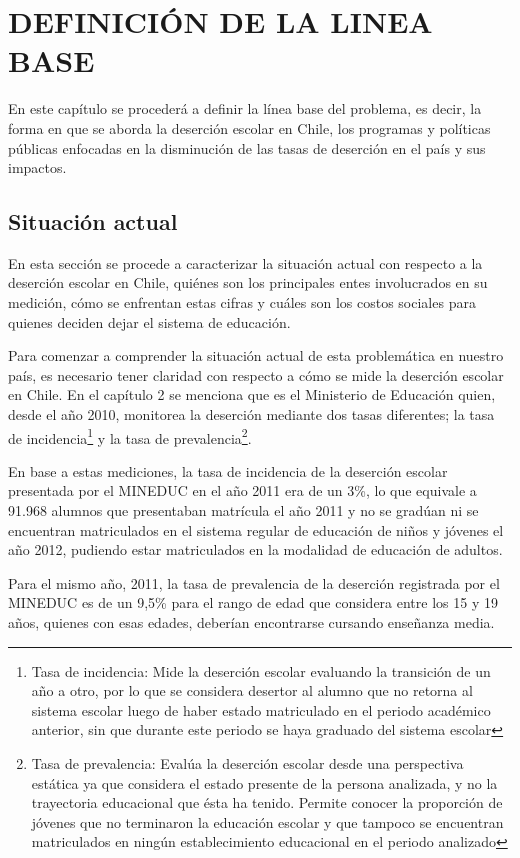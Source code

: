 \chapter{DEFINICIÓN DE LA LINEA BASE}
\label{ch:lineabase}

En este capítulo se procederá a definir la línea base del problema, es decir, la forma en que se aborda la deserción escolar en Chile, los programas y políticas públicas enfocadas en la disminución de las tasas de deserción en el país y sus impactos.

\section{Situación actual}
En esta sección se procede a caracterizar la situación actual con respecto a la deserción escolar en Chile, quiénes son los principales entes involucrados en su medición, cómo se enfrentan estas cifras y cuáles son los costos sociales para quienes deciden dejar el sistema de educación.

Para comenzar a comprender la situación actual de esta problemática en nuestro país, es necesario tener claridad con respecto a cómo se mide la deserción escolar en Chile. En el capítulo 2 se menciona que es el Ministerio de Educación quien, desde el año 2010, monitorea la deserción mediante dos tasas diferentes; la tasa de incidencia\footnote{Tasa de incidencia: Mide la deserción escolar evaluando la transición de un año a otro, por lo que se considera desertor al alumno que no retorna al sistema escolar luego de haber estado matriculado en el periodo académico anterior, sin que durante este periodo se haya graduado del sistema escolar} y la tasa de prevalencia\footnote{Tasa de prevalencia: Evalúa la deserción escolar desde una perspectiva estática ya que considera el estado presente de la persona analizada, y no la trayectoria educacional que ésta  ha  tenido. Permite conocer la proporción de jóvenes que no terminaron la educación escolar y que tampoco se encuentran matriculados en ningún establecimiento educacional en el periodo analizado}.

En base a estas mediciones, la tasa de incidencia de la deserción escolar presentada por el MINEDUC en el año 2011 era de un 3\%, lo que equivale a 91.968 alumnos que presentaban matrícula el año 2011 y no se gradúan ni se encuentran matriculados en el sistema regular de educación de niños y jóvenes el año 2012, pudiendo estar matriculados en la modalidad de educación de adultos. 

Para el mismo año, 2011, la tasa de prevalencia de la deserción registrada por el MINEDUC es de un 9,5\% para el rango de edad que considera entre los 15 y 19 años, quienes con esas edades, deberían encontrarse cursando enseñanza media. 

